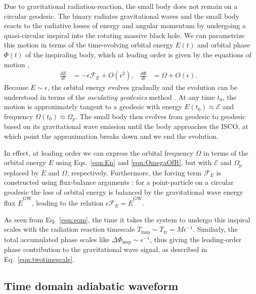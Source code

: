\documentclass[%
 reprint,
 nofootinbib,
 amsmath,amssymb,
 aps,
 prd,
]{revtex4-2}
\begin{document}
Due to gravitational {radiation-reaction}, the small body does not remain on a circular geodesic. The binary {radiates} gravitational waves and the small body {reacts} to the radiative losses of energy and angular momentum by undergoing a quasi-circular inspiral into the rotating massive black hole. We can parametrize this motion in terms of the time-evolving orbital energy ${E}(t)$ and orbital phase $\Phi(t)$ of the inspiraling body, which at leading order is given by the equations of motion \cite{PounWard20,HughETC21},
\begin{align} \label{eqn:eom}
    \frac{d {E}}{dt} &= -\epsilon \mathcal{F}_E + O(\epsilon^2),
    &
    \frac{d\Phi}{dt} &= \Omega + O(\epsilon).
\end{align}
Because $\dot{E} \sim \epsilon$, the orbital energy evolves gradually and the evolution can be understood in terms of the \emph{osculating geodesics} method \cite{GairETC11}. At any time $t_0$, the motion is approximately tangent to a geodesic with energy $E(t_0) \approx \mathcal{E}$ and frequency $\Omega(t_0) \approx \Omega_p$. The small body then evolves from geodesic to geodesic based on its gravitational wave emission until the body approaches the ISCO, at which point the approximation breaks down and we end the evolution.

In effect, at leading order we can express the orbital frequency $\Omega$ in terms of the orbital energy ${E}$ using Eqs.~\eqref{eqn:En} and \eqref{eqn:OmegaOfR}, but with $\mathcal{E}$ and $\Omega_p$ replaced by $E$ and $\Omega$, respectively. Furthermore, the forcing term $\mathcal{F}_E$ is constructed using flux-balance arguments \cite{Mino03, Galt82, QuinWald99}: for a point-particle on a circular geodesic the loss of orbital energy is balanced by the gravitational wave energy flux $\dot{E}^\mathrm{GW}$, leading to the relation $\epsilon \mathcal{F}_E = \dot{E}^\mathrm{GW}$. 

As seen from Eq.~\eqref{eqn:eom}, the time it takes the system to undergo this inspiral scales with the radiation reaction timescale $T_\mathrm{insp} \sim T_\mathrm{rr} = M \epsilon^{-1}$. Similarly, the total accumulated phase scales like $\Delta\Phi_\mathrm{insp} \sim \epsilon^{-1}$, thus giving the leading-order phase contribution to the gravitational wave signal, as described in Eq.~\eqref{eqn:twotimescale}.

\subsection{Time domain adiabatic waveform}
\label{sec:waveform}
\end{document}
